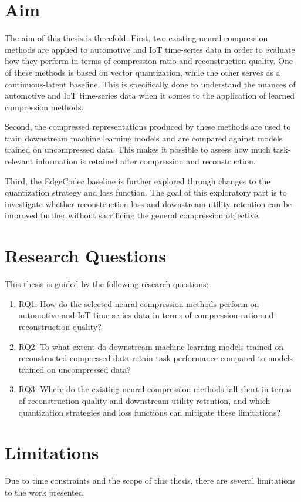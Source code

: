 \section{Aim}
The aim of this thesis is threefold. First, two existing neural compression methods are applied to automotive and IoT time-series data in order to evaluate how they perform in terms of compression ratio and reconstruction quality. One of these methods is based on vector quantization, while the other serves as a continuous-latent baseline. This is specifically done to understand the nuances of automotive and IoT time-series data when it comes to the application of learned compression methods. 

Second, the compressed representations produced by these methods are used to train downstream machine learning models and are compared against models trained on uncompressed data. This makes it possible to assess how much task-relevant information is retained after compression and reconstruction.

Third, the EdgeCodec baseline is further explored through changes to the quantization strategy and loss function. The goal of this exploratory part is to investigate whether reconstruction loss and downstream utility retention can be improved further without sacrificing the general compression objective.

\section{Research Questions}
This thesis is guided by the following research questions:

\begin{enumerate}
	\item RQ1: How do the selected neural compression methods perform on automotive and IoT time-series data in terms of compression ratio and reconstruction quality?
	\item RQ2: To what extent do downstream machine learning models trained on reconstructed compressed data retain task performance compared to models trained on uncompressed data?
	\item RQ3: Where do the existing neural compression methods fall short in terms of reconstruction quality and downstream utility retention, and which quantization strategies and loss functions can mitigate these limitations?
\end{enumerate}

\section{Limitations}
Due to time constraints and the scope of this thesis, there are several limitations to the work presented. 

